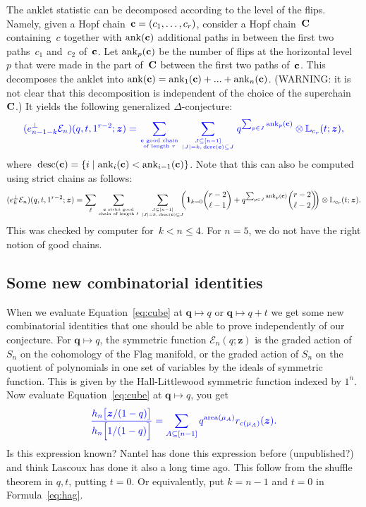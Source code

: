 \documentclass[12pt]{amsart}
\newcommand{\blue}[1]{\textcolor{blue}{#1}}
\newcommand{\green}[1]{\textcolor{green!75!black}{#1}}
\theoremstyle{plain}
\theoremstyle{definition}
\theoremstyle{remark}
\newcommand{\one}{\mathbf{1}}
\newcommand{\Qvar}{{\bm q}}
\newcommand{\Zvar}{{\bm z}}
\newcommand\area{\mathop{\mathrm{area}}}
\newcommand{\desc}{\mathop{\mathrm{desc}}}
\newcommand{\ank}{\mathop{\mathrm{ank}}}
\newcommand{\set}[2]{\left\{ #1 \;\middle|\; #2 \right\}} %
\begin{document}
The anklet statistic can be decomposed according to the level of the flips.
Namely, given a Hopf chain~${\bf c} = (c_1, \dots, c_r)$, consider a Hopf chain~${\bf C}$ containing~$c$ together with $\ank({\bf c})$ additional paths in between the first two paths~$c_1$ and~$c_2$ of~${\bf c}$.
Let $\ank_p({\bf c})$ be the number of flips at the horizontal level~$p$ that were made in the part of~${\bf C}$ between the first two paths of~${\bf c}$.
This decomposes the anklet into $\ank({\bf c}) = \ank_1({\bf c}) + ... + \ank_n({\bf c})$.
(\green{WARNING: it is not clear that this decomposition is independent of the choice of the superchain~${\bf C}$.})
It yields the following generalized $\Delta$-conjecture:
\[
\blue{
(e_{n-1-k}^\perp {\mathcal E}_n)(q, t, 1^{r-2};\Zvar) = \sum_{{\bf c} \text{ good chain} \atop \text{of length } r} \sum_{J \subseteq [n-1] \atop |J| = k, \, \desc({\bf c}) \subseteq J} q^{\sum_{p \in J} \ank_p({\bf c})} \otimes {\mathbb L}_{c_r}(t;\Zvar),
}
\]
where~$\desc({\bf c}) = \set{i}{\ank_i({\bf c}) < \ank_{i-1}({\bf c})}$.
Note that this can also be computed using strict chains as follows:
\[
(e_k^\perp {\mathcal E}_n)(q, t, 1^{r-2};\Zvar) = \sum_\ell \sum_{{\bf c} \text{ strict good} \atop \text{chain of length } \ell} \sum_{J \subseteq [n-1] \atop |J| = k, \, \desc({\bf c}) \subseteq J} \!\!\!\! \bigg( \one_{k = 0} \binom{r-2}{\ell-1} + q^{\sum_{p \in J} \ank_p({\bf c})} \binom{r-2}{\ell-2} \!\! \bigg) \otimes {\mathbb L}_{c_r}(t;\Zvar).
\]
This was checked by computer for~$k < n \le 4$. For $n = 5$, we do not have the right notion of good chains.

\subsection{Some new combinatorial identities}

When we evaluate Equation~\eqref{eq:cube} at $\Qvar\mapsto q$ or $\Qvar\mapsto q+t$ we get some new combinatorial identities that one should be able to prove independently of our conjecture.
For $\Qvar\mapsto q$, the symmetric function ${\mathcal E}_n(q;\Zvar)$ is the graded action of $S_n$ on the cohomology of the Flag manifold, or the graded action of $S_n$ on the quotient of polynomials in one set of variables by the ideals of symmetric function.
This is given by the Hall-Littlewood symmetric function indexed by $1^n$.
Now evaluate Equation~\eqref{eq:cube} at $\Qvar\mapsto q$, you get
\begin{equation}\label{eq:onevar}
\blue{
\frac{h_n\big[ {\Zvar}/{(1-q)}\big]}{h_n\Big[ {1}/{(1-q)}\Big]} = \sum_{A\subseteq[n-1]} q^{\area(\mu_A)} r_{c(\mu_A)}(\Zvar).
}
\end{equation}
Is this expression known? Nantel has done this expression before (unpublished?) and think Lascoux has done it also a long time ago. 
This follow from  the shuffle theorem in $q,t$, putting $t=0$. Or equivalently, put $k=n-1$ and $t=0$ in Formula~\eqref{eq:hag}.
\end{document}
